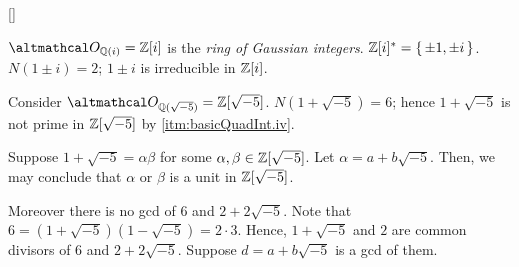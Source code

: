 \documentclass[../modern_algebra_2.tex]{subfiles}
\begin{document}
\begin{Example}{}[]
    \begin{enumerate}[label=(\roman*), ref=\protect{(\roman*)}, listparindent=\parindent]
        \ii 
        \(\mcal{O}_{\QQ(i)} = \ZZ{}[i]\) is the \emph{ring of Gaussian integers}.
        \(\ZZ{}[i]^\ast = \{\,\pm 1, \pm i\,\}\).
        \(N(1 \pm i) = 2\); \(1 \pm i\) is irreducible in \(\ZZ{}[i]\).

        \ii
        Consider \(\mcal{O}_{\QQ(\sqrt{-5})} = \ZZ{}[\sqrt{-5}]\).
        \(N(1 + \sqrt{-5}) = 6\); hence \(1 + \sqrt{-5}\) is not prime in \(\ZZ{}[\sqrt{-5}]\)
        by \ref{itm:basicQuadInt.iv}.

        Suppose \(1 + \sqrt{-5} = \alpha \beta\) for some \(\alpha, \beta \in \ZZ{}[\sqrt{-5}]\).
        Let \(\alpha = a + b\sqrt{-5}\).
        Then, we may conclude that \(\alpha\) or \(\beta\) is a unit in \(\ZZ{}[\sqrt{-5}]\).

        Moreover there is no gcd of \(6\) and \(2 + 2\sqrt{-5}\).
        Note that \(6 = (1 + \sqrt{-5})(1 - \sqrt{-5}) = 2 \cdot 3\).
        Hence, \(1+\sqrt{-5}\) and \(2\) are common divisors of \(6\) and \(2 + 2\sqrt{-5}\).
        Suppose \(d = a + b\sqrt{-5}\) is a gcd of them.
    \end{enumerate}
\end{Example}
\end{document}
